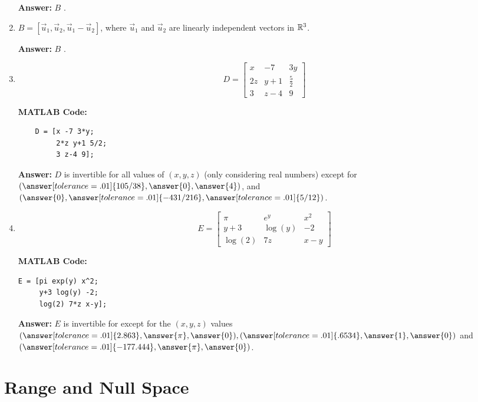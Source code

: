 \documentclass{ximera}
\begin{document}
\begin{example}
\begin{enumerate}
    \textbf{Answer:}
    $B$ .


    \item $B=[\vec{u}_1,\vec{u}_2,\vec{u}_1-\vec{u}_2]$, where $\vec{u}_1$ and $\vec{u}_2$ are linearly independent vectors in $\mathbb{R}^3$.
    
    \textbf{Answer:}
    $B$ .

        \item \[
        D = \begin{bmatrix} 
        x & -7 & 3y \\ 
        2z & y+1 & \frac{5}{2} \\ 
        3 & z-4 & 9 
        \end{bmatrix}
        \]

\textbf{MATLAB Code:}
\begin{verbatim}
    D = [x -7 3*y;
         2*z y+1 5/2;
         3 z-4 9];
\end{verbatim}

    \textbf{Answer:}
        $D$ is invertible for all values of $(x,y,z)$ (only considering real numbers) except for $(\answer[tolerance=.01]{105/38}, \answer{0}, \answer{4})$, and $(\answer{0}, \answer[tolerance=.01]{-431/216}, \answer[tolerance=.01]{5/12})$.


\item
        \[
        E = \begin{bmatrix} 
        \pi & e^y & x^2 \\ 
        y+3 & \log(y) & -2 \\ 
        \log(2) & 7z & x - y 
        \end{bmatrix}
        \]

\textbf{MATLAB Code:}
\begin{verbatim}
E = [pi exp(y) x^2;
     y+3 log(y) -2;
     log(2) 7*z x-y];
\end{verbatim}
            
    \textbf{Answer:}
        $E$ is invertible for except for the $(x,y,z)$ values $(\answer[tolerance=.01]{2.863}, \answer{\pi},\answer{0}), (\answer[tolerance=.01]{.6534}, \answer{1},\answer{0})$ and $(\answer[tolerance=.01]{-177.444}, \answer{\pi},\answer{0})$.
    \end{enumerate}
\end{example}

\section*{Range and Null Space}
\end{document}
